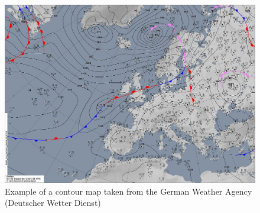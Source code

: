 
\begin{figure}[h]
\includegraphics[width=\linewidth]{images/contour-map.jpg}
\caption{Example of a contour map taken from the German Weather Agency (Deutscher Wetter Dienst)~\cite{dwd}}
\label{fig:contour map}
\centering
\end{figure}

